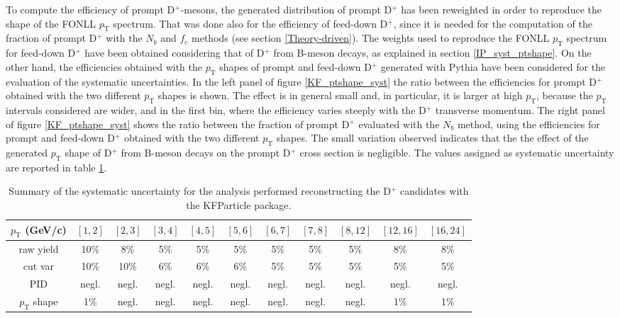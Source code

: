 \documentclass[b5paper,10pt,twoside,oldstyle,classica]{toptesi}
\newcommand{\pt}{p_\text{T}}
\begin{document}
To compute the efficiency of prompt D$^+$-mesons, the generated distribution of prompt D$^+$ has been reweighted in order to reproduce the shape of the FONLL $\pt$ spectrum. That was done also for the efficiency of feed-down D$^+$, since it is needed for the computation of the fraction of prompt D$^+$ with the $N_b$ and $f_c$ methods (see section \ref{Theory-driven}). The weights used to reproduce the FONLL $\pt$ spectrum for feed-down D$^+$ have been obtained considering that of D$^+$ from B-meson decays, as explained in section \ref{IP_syst_ptshape}. On the other hand, the efficiencies obtained with the $\pt$ shapes of prompt and feed-down D$^+$ generated with Pythia have been considered for the evaluation of the systematic uncertainties. In the left panel of figure \ref{KF_ptshape_syst} the ratio between the efficiencies for prompt D$^+$ obtained with the two different $\pt$ shapes is shown. The effect is in general small and, in particular, it is larger at high $\pt$, because the $\pt$ intervals considered are wider, and in the first bin, where the efficiency varies steeply with the D$^+$ transverse momentum. The right panel of figure \ref{KF_ptshape_syst} shows the ratio between the fraction of prompt D$^+$ evaluated with the $N_b$ method, using the efficiencies for prompt and feed-down D$^+$ obtained with the two different $\pt$ shapes. The small variation observed indicates that the the effect of the generated $\pt$ shape of D$^+$ from B-meson decays on the prompt D$^+$ cross section is negligible. The values assigned as systematic uncertainty are reported in table \ref{KF_syst}.
\begin{table}[b]
\centering 
\begin{center} %
\renewcommand\arraystretch{1.5} 
\fontsize{7}{10}\selectfont
\begin{tabular}{|c|c|c|c|c|c|c|c|c|c|c|}
\hline
$\pt$ (GeV/c) & $[1,2]$ & $[2,3]$ & $[3,4]$ & $[4,5]$ & $[5,6]$ & $[6,7]$ & $[7,8]$ & $[8,12]$ & $[12,16]$ & $[16,24]$\\
\hline
raw yield & 10\% & 8\% & 5\% & 5\% & 5\% & 5\% & 5\% & 5\% & 8\% & 8\%\\
cut var & 10\% & 10\% & 6\% & 6\% & 6\% & 5\% & 5\% & 5\% & 5\% & 5\%\\
PID & negl. & negl. & negl. & negl. & negl. & negl. & negl. & negl. & negl. & negl.\\
$\pt$ shape & 1\% & negl. & negl. & negl. & negl. & negl. & negl. & negl. & 1\% & 1\%\\
\hline
\end{tabular}
\caption{Summary of the systematic uncertainty for the analysis performed reconstructing the D$^+$ candidates with the KFParticle package.}
\label{KF_syst}
\end{center} 
\end{table}
\end{document}
